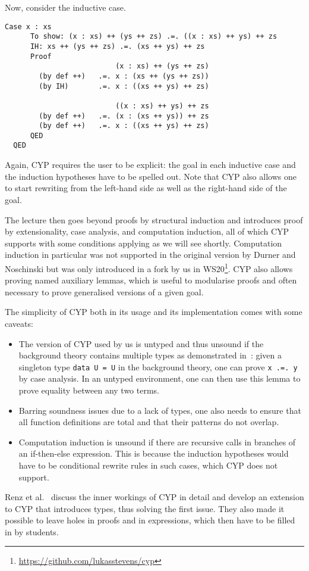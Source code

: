 Now, consider the inductive case.
\begin{lstlisting}[style=cyp]
    Case x : xs
      To show: (x : xs) ++ (ys ++ zs) .=. ((x : xs) ++ ys) ++ zs
      IH: xs ++ (ys ++ zs) .=. (xs ++ ys) ++ zs
      Proof
                          (x : xs) ++ (ys ++ zs)
        (by def ++)   .=. x : (xs ++ (ys ++ zs))
        (by IH)       .=. x : ((xs ++ ys) ++ zs)

                          ((x : xs) ++ ys) ++ zs
        (by def ++)   .=. (x : (xs ++ ys)) ++ zs
        (by def ++)   .=. x : ((xs ++ ys) ++ zs)
      QED
  QED
\end{lstlisting}
Again, CYP requires the user to be explicit: the goal in each inductive case and the induction hypotheses have to be spelled out.
Note that CYP also allows one to start rewriting from the left-hand side as well as the right-hand side of the goal.

The lecture then goes beyond proofs by structural induction and introduces proof by extensionality, case analysis, and computation induction,
all of which CYP supports with some conditions applying as we will see shortly.
Computation induction in particular was not supported in the original version by Durner and Noschinski but was only introduced in a fork by us in WS20\footnote{\url{https://github.com/lukasstevens/cyp}}.
CYP also allows proving named auxiliary lemmas,
which is useful to modularise proofs
and often necessary to prove generalised versions of a given goal.

The simplicity of CYP both in its usage and its implementation comes with some caveats:
\begin{itemize}
    \item The version of CYP used by us is untyped and thus unsound if the background theory contains multiple types as demonstrated in~\cite{cyp_holes}: given a singleton type \lstinline[style=cyp]!data U = U! in the background theory,
      one can prove \lstinline[style=cyp]!x .=. y! by case analysis.
        In an untyped environment, one can then use this lemma to prove equality between any two terms.
    \item Barring soundness issues due to a lack of types, one also needs to ensure that all function definitions are total and that their patterns do not overlap.
    \item Computation induction is unsound if there are recursive calls in branches of an if-then-else expression.
      This is because the induction hypotheses would have to be conditional rewrite rules in such cases, which CYP does not support.
\end{itemize}
Renz et al.~\cite{cyp_holes} discuss the inner workings of CYP in detail and develop an extension to CYP that introduces types,
thus solving the first issue.
They also made it possible to leave holes in proofs and in expressions, which then have to be filled in by students.

